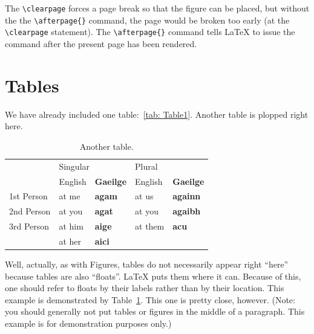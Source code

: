 \documentclass[msc,oneside]{ubcthesis}
\theoremstyle{definition}
\begin{document}
The \verb|\clearpage| forces a page break so that the figure can be
placed, but without the the \verb|\afterpage{}| command, the page
would be broken too early (at the \verb|\clearpage| statement).  The
\verb|\afterpage{}| command tells \LaTeX{} to issue the command after
the present page has been rendered.

\section{Tables}
We have already included one table:~\ref {tab: Table1}.  Another table
is plopped right here.
\begin{table}[ht]
  \begin{center}
    \begin{tabular}{|l||l|l||l|l|}
      \hline
      &\multicolumn{2}{l|}{Singular}&\multicolumn{2}{l|}{Plural}\\
      \cline{2-5}
       &English&\textbf{Gaeilge}&English&\textbf{Gaeilge}\\
      \hline\hline
      1st Person&at me&\textbf{agam}&at us&\textbf{againn}\\
      2nd Person&at you&\textbf{agat}&at you&\textbf{agaibh}\\
      3rd Person&at him&\textbf{aige}&at them&\textbf{acu}\\
       &at her&\textbf{aici}& & \\
      \hline
    \end{tabular}
    \caption{
      \label{tab:Table2}
      Another table.}
  \end{center}
\end{table}
Well, actually, as with Figures, tables do not
necessarily appear right ``here'' because tables are also ``floats''.
\LaTeX{} puts them where it can.  Because of this, one should refer to
floats by their labels rather than by their location.  This example is
demonstrated by Table~\ref{tab:Table2}.  This one is pretty close,
however.  (Note: you should generally not put tables or figures in the
middle of a paragraph.  This example is for demonstration purposes
only.)
\end{document}
